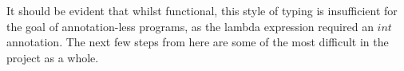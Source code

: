 \documentclass{l4proj}
\begin{document}
It should be evident that whilst functional, this style of typing is insufficient for the goal of annotation-less programs, as the lambda expression required an $int$ annotation.
The next few steps from here are some of the most difficult in the project as a whole.









\end{document}
